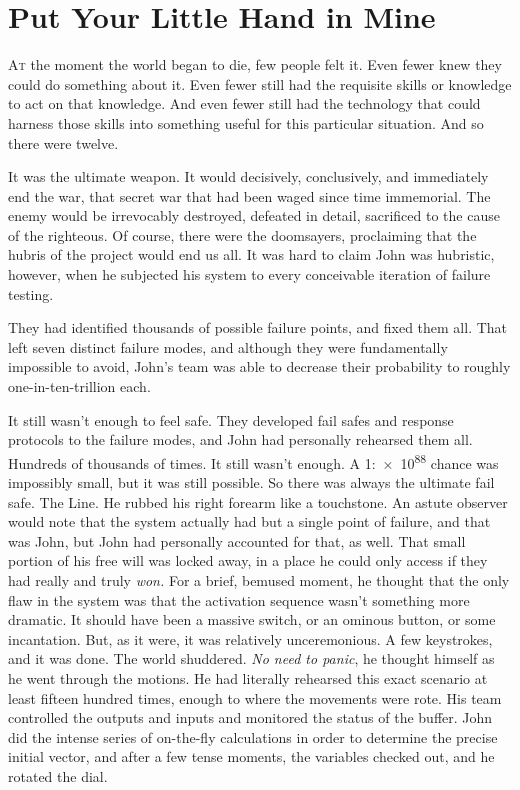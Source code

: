\chapter{Put Your Little Hand in Mine}


\lettrine{A}{t} the moment the world began to die, few people felt it.
\SmallVSpace
Even fewer knew they could do something about it.
\SmallVSpace
Even fewer still had the requisite skills or knowledge to act on that knowledge.
\SmallVSpace
And even fewer still had the technology that could harness those skills into something useful for this particular situation.
\SomeVSpace
And so there were twelve.
\simpleline
{}

It was the ultimate weapon.
\SomeVSpace
It would decisively, conclusively, and immediately end the war, that secret war that had been waged since time immemorial. The enemy would be irrevocably destroyed, defeated in detail, sacrificed to the cause of the righteous. Of course, there were the doomsayers, proclaiming that the hubris of the project would end us all. It was hard to claim John was hubristic, however, when he subjected his system to every conceivable iteration of failure testing.

They had identified thousands of possible failure points, and fixed them all. That left seven distinct failure modes, and although they were fundamentally impossible to avoid, John’s team was able to decrease their probability to roughly one-in-ten-trillion each.

It still wasn’t enough to feel safe. They developed fail safes and response protocols to the failure modes, and John had personally rehearsed them all. Hundreds of thousands of times.
\SomeVSpace
It still wasn’t enough.
\SomeVSpace
A 1:\num{e88} chance was impossibly small, but it was still possible. So there was always the ultimate fail safe. The Line. He rubbed his right forearm like a touchstone. An astute observer would note that the system actually had but a single point of failure, and that was John, but John had personally accounted for that, as well. That small portion of his free will was locked away, in a place he could only access if they had really and truly \emph{won.}
\SomeVSpace
For a brief, bemused moment, he thought that the only flaw in the system was that the activation sequence wasn’t something more dramatic. It should have been a massive switch, or an ominous button, or some incantation. But, as it were, it was relatively unceremonious. A few keystrokes, and it was done.
\simpleline
The world shuddered.
\simpleline
\emph{No need to panic}, he thought himself as he went through the motions. He had literally rehearsed this exact scenario at least fifteen hundred times, enough to where the movements were rote. His team controlled the outputs and inputs and monitored the status of the buffer. John did the intense series of on-the-fly calculations in order to determine the precise initial vector, and after a few tense moments, the variables checked out, and he rotated the dial.

